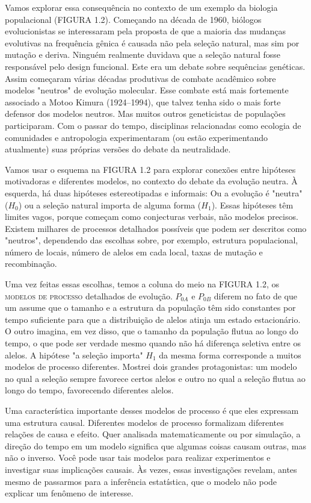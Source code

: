 Vamos explorar essa consequência no contexto de um exemplo da biologia populacional (FIGURA 1.2). Começando na década de 1960, biólogos evolucionistas se interessaram pela proposta de que a maioria das mudanças evolutivas na frequência gênica é causada não pela seleção natural, mas sim por mutação e deriva. Ninguém realmente duvidava que a seleção natural fosse responsável pelo design funcional. Este era um debate sobre sequências genéticas. Assim começaram várias décadas produtivas de combate acadêmico sobre modelos "neutros" de evolução molecular. Esse combate está mais fortemente associado a Motoo Kimura (1924–1994), que talvez tenha sido o mais forte defensor dos modelos neutros. Mas muitos outros geneticistas de populações participaram. Com o passar do tempo, disciplinas relacionadas como ecologia de comunidades e antropologia experimentaram (ou estão experimentando atualmente) suas próprias versões do debate da neutralidade.

Vamos usar o esquema na FIGURA 1.2 para explorar conexões entre hipóteses motivadoras e diferentes modelos, no contexto do debate da evolução neutra. À esquerda, há duas hipóteses estereotipadas e informais: Ou a evolução é "neutra" ($H_0$) ou a seleção natural importa de alguma forma ($H_1$). Essas hipóteses têm limites vagos, porque começam como conjecturas verbais, não modelos precisos. Existem milhares de processos detalhados possíveis que podem ser descritos como "neutros", dependendo das escolhas sobre, por exemplo, estrutura populacional, número de locais, número de alelos em cada local, taxas de mutação e recombinação.

Uma vez feitas essas escolhas, temos a coluna do meio na FIGURA 1.2, os \textsc{modelos de processo} detalhados de evolução. $P_{0A}$ e $P_{0B}$ diferem no fato de que um assume que o tamanho e a estrutura da população têm sido constantes por tempo suficiente para que a distribuição de alelos atinja um estado estacionário. O outro imagina, em vez disso, que o tamanho da população flutua ao longo do tempo, o que pode ser verdade mesmo quando não há diferença seletiva entre os alelos. A hipótese "a seleção importa" $H_1$ da mesma forma corresponde a muitos modelos de processo diferentes. Mostrei dois grandes protagonistas: um modelo no qual a seleção sempre favorece certos alelos e outro no qual a seleção flutua ao longo do tempo, favorecendo diferentes alelos.

Uma característica importante desses modelos de processo é que eles expressam uma estrutura causal. Diferentes modelos de processo formalizam diferentes relações de causa e efeito. Quer analisada matematicamente ou por simulação, a direção do tempo em um modelo significa que algumas coisas causam outras, mas não o inverso. Você pode usar tais modelos para realizar experimentos e investigar suas implicações causais. Às vezes, essas investigações revelam, antes mesmo de passarmos para a inferência estatística, que o modelo não pode explicar um fenômeno de interesse.


